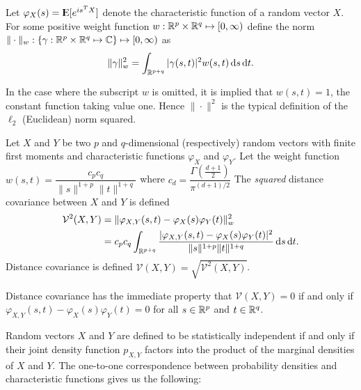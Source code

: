 Let $\varphi_X(s) = {\rm I\kern-.3em E}[e^{i s^T X}]$ denote the characteristic
function of a random vector $X$. For some positive weight function
$w : \mathbb{R}^p \times \mathbb{R}^q \mapsto [0, \infty)$ define the norm
$\|\cdot\|_w : \{\gamma : \mathbb{R}^p \times \mathbb{R}^q \mapsto \mathbb{C}\}
               \mapsto [0, \infty)$ as
\[ \|\gamma\|_w^2 = \int_{\mathbb{R}^{p+q}} |\gamma(s,t)|^2 w(s,t)
                    \mathop{}\!\mathrm{d} s \mathop{}\!\mathrm{d} t. \]

In the case where the subscript $w$ is omitted, it is implied that
$w(s,t) = 1$, the constant function taking value one. Hence
$\|\cdot\|^2$ is the typical definition of the $\ell_2$ (Euclidean)
norm squared.

\begin{definition} 
Let $X$ and $Y$ be two $p$ and $q$-dimensional (respectively) random
vectors with finite first moments and characteristic functions
$\varphi_X$ and $\varphi_Y$. Let the weight function
$w(s,t) = \dfrac{c_p c_q}{\|s\|^{1+p} \|t\|^{1+q}}$ where
$c_d = \dfrac{\Gamma(\frac{d+1}{2})}{\pi^{(d+1) / 2}}$
The \textit{squared} distance covariance between $X$ and $Y$ is defined
\begin{align*}
\mathcal{V}^2 (X,Y)
&= \| \varphi_{X,Y}(s,t) - \varphi_X(s)\varphi_Y(t) \|_w^2 \\
&= c_p c_q \int_{\mathbb{R}^{p+q}}
   \dfrac{|\varphi_{X,Y}(s,t) - \varphi_X(s)\varphi_Y(t)|^2}
         {\|s\|^{1+p} \|t\|^{1+q}} \mathop{}\!\mathrm{d} s \mathop{}\!\mathrm{d} t.
\end{align*}
Distance covariance is defined
$\mathcal{V}(X,Y) = \sqrt{\mathcal{V}^2(X,Y)}$.
\end{definition}

Distance covariance has the immediate property that
$\mathcal{V}(X,Y) = 0$ if and only if
$\varphi_{X,Y}(s,t) - \varphi_X(s) \varphi_Y(t) = 0$ for all
$s \in \mathbb{R}^p$ and $t \in \mathbb{R}^q$.

Random vectors $X$ and $Y$ are defined to be statistically independent
if and only if their joint density function $p_{X,Y}$ factors into the
product of the marginal densities of $X$ and $Y$. The one-to-one
correspondence between probability densities and characteristic
functions gives us the following:

